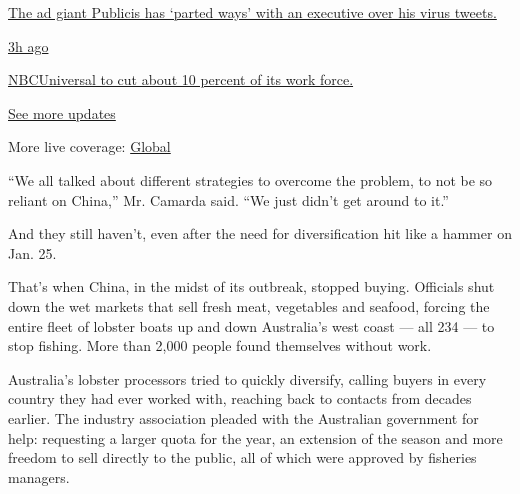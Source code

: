 \href{https://www.nytimes.com/live/2020/08/04/business/stock-market-today-coronavirus?action=click\&pgtype=Article\&state=default\&region=MAIN_CONTENT_1\&context=storylines_live_updates\#the-ad-giant-publicis-has-parted-ways-with-an-executive-over-his-virus-tweets}{The
ad giant Publicis has `parted ways' with an executive over his virus
tweets.}

\href{https://www.nytimes.com/live/2020/08/04/business/stock-market-today-coronavirus?action=click\&pgtype=Article\&state=default\&region=MAIN_CONTENT_1\&context=storylines_live_updates\#nbcuniversal-to-cut-about-10-percent-of-its-work-force}{3h
ago}

\href{https://www.nytimes.com/live/2020/08/04/business/stock-market-today-coronavirus?action=click\&pgtype=Article\&state=default\&region=MAIN_CONTENT_1\&context=storylines_live_updates\#nbcuniversal-to-cut-about-10-percent-of-its-work-force}{NBCUniversal
to cut about 10 percent of its work force.}

\href{https://www.nytimes.com/live/2020/08/04/business/stock-market-today-coronavirus?action=click\&pgtype=Article\&state=default\&region=MAIN_CONTENT_1\&context=storylines_live_updates}{See
more updates}

More live coverage:
\href{https://www.nytimes.com/2020/08/04/world/coronavirus-cases.html?action=click\&pgtype=Article\&state=default\&region=MAIN_CONTENT_1\&context=storylines_live_updates}{Global}

``We all talked about different strategies to overcome the problem, to
not be so reliant on China,'' Mr. Camarda said. ``We just didn't get
around to it.''

And they still haven't, even after the need for diversification hit like
a hammer on Jan. 25.

That's when China, in the midst of its outbreak, stopped buying.
Officials shut down the wet markets that sell fresh meat, vegetables and
seafood, forcing the entire fleet of lobster boats up and down
Australia's west coast --- all 234 --- to stop fishing. More than 2,000
people found themselves without work.

Australia's lobster processors tried to quickly diversify, calling
buyers in every country they had ever worked with, reaching back to
contacts from decades earlier. The industry association pleaded with the
Australian government for help: requesting a larger quota for the year,
an extension of the season and more freedom to sell directly to the
public, all of which were approved by fisheries managers.

